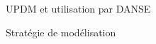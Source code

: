 \begin{frame}{UPDM et utilisation par DANSE}
\end{frame}


\begin{frame}{Stratégie de modélisation}
\end{frame}

